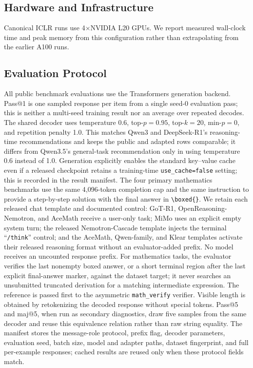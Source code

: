 \subsection{Hardware and Infrastructure}

Canonical ICLR runs use 4$\times$NVIDIA L20 GPUs. We report measured wall-clock time and peak memory from this configuration rather than extrapolating from the earlier A100 runs.

\subsection{Evaluation Protocol}
\label{app:eval_details}

All public benchmark evaluations use the Transformers generation backend. Pass@1 is one sampled response per item from a single seed-0 evaluation pass; this is neither a multi-seed training result nor an average over repeated decodes. The shared decoder uses temperature 0.6, top-$p{=}0.95$, top-$k{=}20$, min-$p{=}0$, and repetition penalty 1.0. This matches Qwen3 and DeepSeek-R1's reasoning-time recommendations and keeps the public and adapted rows comparable; it differs from Qwen3.5's general-task recommendation only in using temperature 0.6 instead of 1.0. Generation explicitly enables the standard key--value cache even if a released checkpoint retains a training-time \texttt{use\_cache=false} setting; this is recorded in the result manifest. The four primary mathematics benchmarks use the same 4,096-token completion cap and the same instruction to provide a step-by-step solution with the final answer in \texttt{\textbackslash boxed\{\}}. We retain each released chat template and documented control: GoT-R1, OpenReasoning-Nemotron, and AceMath receive a user-only task; MiMo uses an explicit empty system turn; the released Nemotron-Cascade template injects the terminal ``\texttt{/think}'' control; and the AceMath, Qwen-family, and Klear templates activate their released reasoning format without an evaluator-added prefix. No model receives an uncounted response prefix. For mathematics tasks, the evaluator verifies the last nonempty boxed answer, or a short terminal region after the last explicit final-answer marker, against the dataset target; it never searches an unsubmitted truncated derivation for a matching intermediate expression. The reference is passed first to the asymmetric \texttt{math\_verify} verifier. Visible length is obtained by retokenizing the decoded response without special tokens. Pass@5 and maj@5, when run as secondary diagnostics, draw five samples from the same decoder and reuse this equivalence relation rather than raw string equality. The manifest stores the message-role protocol, prefix flag, decoder parameters, evaluation seed, batch size, model and adapter paths, dataset fingerprint, and full per-example responses; cached results are reused only when these protocol fields match.
